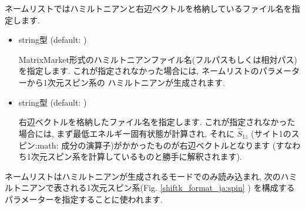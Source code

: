 \documentclass[letterpaper,10pt,dvipdfmx,openany]{sphinxmanual}
\begin{document}
 ネームリストではハミルトニアンと右辺ベクトルを格納しているファイル名を指定します.
\begin{itemize}
\item {} 

 string型 (default: )

MatrixMarket形式のハミルトニアンファイル名(フルパスもしくは相対パス)を指定します.
これが指定されなかった場合には,
 ネームリストのパラメーターから1次元スピン系の
ハミルトニアンが生成されます.

\item {} 

 string型 (default: )

 右辺ベクトルを格納したファイル名を指定します.
これが指定されなかった場合には, まず最低エネルギー固有状態が計算され,
それに \({\hat S}_{1 z}\) (サイト1のスピン:math: 成分の演算子)がかかったものが右辺ベクトルとなります
(すなわち1次元スピン系を計算しているものと勝手に解釈されます).

\end{itemize}

ネームリストはハミルトニアンが生成されるモードでのみ読み込まれ,
次のハミルトニアンで表される1次元スピン系(Fig. \ref{shiftk_format_ja:spin} )
を構成するパラメーターを指定することに使われます.
\end{document}
